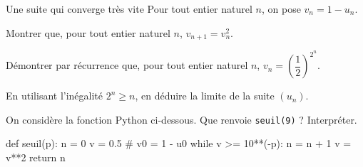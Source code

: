 \begin{exercice}[3]{Une suite qui converge très vite}
Pour tout entier naturel $n$, on pose $v_n=1-u_n$.
\begin{questions}[start=6]
  \item Montrer que, pour tout entier naturel $n$, $v_{n+1}=v_n^{2}$.
  \item Démontrer par récurrence que, pour tout entier naturel $n$, $v_n=\left(\dfrac{1}{2}\right)^{2^{n}}$.
  \item En utilisant l'inégalité $2^{n}\geq n$, en déduire la limite de la suite $(u_n)$.
  \item On considère la fonction Python ci-dessous. Que renvoie \lstinline[style=otPython]!seuil(9)! ? Interpréter.
\end{questions}
\begin{python}
def seuil(p):
    n = 0
    v = 0.5               # v0 = 1 - u0
    while v >= 10**(-p):
        n = n + 1
        v = v**2
    return n
\end{python}
\end{exercice}

